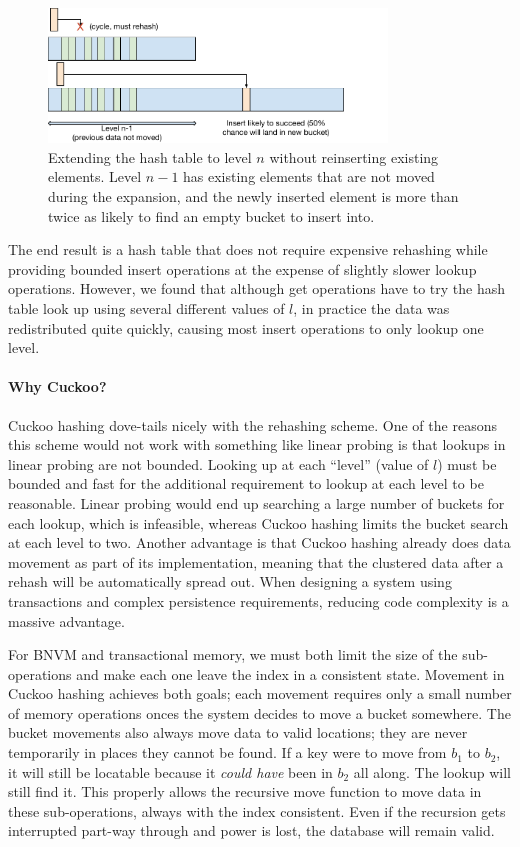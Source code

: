 \begin{figure}
\centering
\hspace*{1mm}
\includegraphics[width=90mm]{fig/cuckoo_rehash}
\caption{Extending the hash table to level $n$ without reinserting existing
elements. Level $n-1$ has existing elements that are not moved during the
expansion, and the newly inserted element is more than twice as likely to find
an empty bucket to insert into.}
\label{fig:rehash}
\end{figure}

The end result is a hash table that does not require expensive rehashing while
providing bounded insert operations at the expense of slightly slower lookup
operations. However, we found that although get operations have to try the hash
table look up using several different values of $l$, in practice the data was redistributed
quite quickly, causing most insert operations to only lookup one level.


\paragraph{Why Cuckoo?}

Cuckoo hashing dove-tails nicely with the rehashing scheme. One of the reasons
this scheme would not work with something like linear probing is that lookups in
linear probing are not bounded. Looking up at each ``level'' (value of $l$) must
be bounded and fast for the additional requirement to lookup at each level to be
reasonable. Linear probing would end up searching a large number of buckets for
each lookup, which is infeasible, whereas Cuckoo hashing limits the bucket search at
each level to two.
Another advantage is that Cuckoo hashing already does data movement as part of
its implementation, meaning that the clustered data after a rehash will be
automatically spread out. When designing a system using transactions and complex
persistence requirements, reducing code complexity is a massive advantage.


For BNVM and transactional memory, we must both limit the size of the
sub-operations and make each one leave the index in a consistent state. Movement
in Cuckoo hashing achieves both goals; each movement requires only a small
number of memory operations onces the system decides to move a bucket somewhere.
The bucket movements also always move data to valid locations; they are never
temporarily in places they cannot be found.
If a key were to move from $b_1$ to $b_2$, it
will still be locatable because it \textit{could have} been in $b_2$ all along.
The lookup will still find it. This properly allows the recursive move function
to move data in these sub-operations, always with the index consistent. Even if
the recursion gets interrupted part-way through and power is lost, the database
will remain valid.




